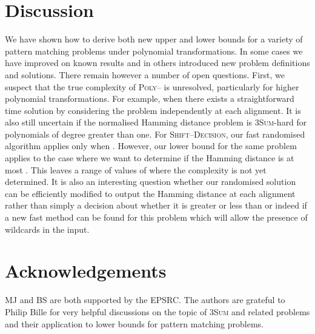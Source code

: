 \documentclass[11pt]{article}
\newcommand{\LpolyWild}{\textsc{Poly--}\xspace}
\newcommand{\skDecision}{\textsc{Shift--Decision}\xspace}
\newcommand{\threeSUM}{\textsc{3Sum}\xspace}
\theoremstyle{plain}
\theoremstyle{definition}
\begin{document}
\section{Discussion}\label{sec:discussion}

We have shown how to derive both new upper and lower bounds for a variety of pattern matching problems under polynomial transformations. In some cases we have improved on known results and in others introduced new problem definitions and solutions.  There remain however a number of open questions. First, we suspect that the true complexity of \LpolyWild is unresolved, particularly for higher polynomial transformations. For example, when  there exists a straightforward  time solution by considering the problem independently at each alignment.  It is also still uncertain if the normalised Hamming distance problem is \threeSUM-hard for polynomials of degree greater than one. For \skDecision, our fast randomised algorithm applies only when . However, our lower bound for the same problem applies to the case where we want to determine if the Hamming distance is at most . This leaves a range of values of  where the complexity is not yet determined.  It is also an interesting question whether our randomised solution can be efficiently modified to output the Hamming distance at each alignment rather than simply a decision about whether it is greater or less than  or indeed if a new fast method can be found for this problem which will allow the presence of wildcards in the input.

\section{Acknowledgements}
MJ and BS are both supported by the EPSRC. The authors are grateful to Philip Bille for very helpful discussions on the topic of \threeSUM and related problems and their application to lower bounds for pattern matching problems.

\printbibliography
\end{document}
